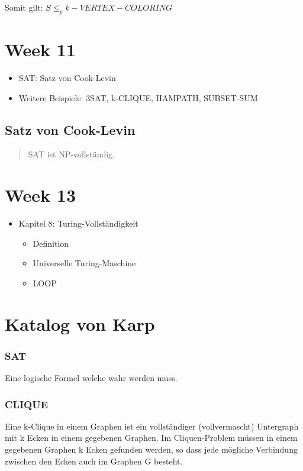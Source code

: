 \documentclass[11pt,twoside,landscape]{article}
\begin{document}
\begin{multicols}{3}
Somit gilt: \(S \leq_p k-VERTEX-COLORING\)

\section{Week 11}
\label{sec:orgcad386b}
\begin{itemize}
\item SAT: Satz von Cook-Levin
\item Weitere Beispiele: 3SAT, k-CLIQUE, HAMPATH, SUBSET-SUM
\end{itemize}


\subsection{Satz von Cook-Levin}
\label{sec:org2496426}
\begin{quote}
SAT ist NP-vollständig.
\end{quote}

\section{Week 13}
\label{sec:orgf006fe9}
\begin{itemize}
\item Kapitel 8: Turing-Vollständigkeit
\begin{itemize}
\item Definition
\item Universelle Turing-Maschine
\item LOOP
\end{itemize}
\end{itemize}







\newpage
\section{Katalog von Karp}
\label{sec:orgd3746ca}
\subsubsection*{SAT}
\label{sec:orgd67f600}
Eine logische Formel welche wahr werden muss.
\subsubsection*{CLIQUE}
\label{sec:org330a1df}
Eine k-Clique in einem Graphen ist ein vollständiger (vollvermascht) Untergraph mit k Ecken in einem gegebenen Graphen. Im Cliquen-Problem müssen in einem gegebenen Graphen k Ecken gefunden werden, so dass jede mögliche Verbindung zwischen den Ecken auch im Graphen G besteht.

\end{multicols}
\end{document}
